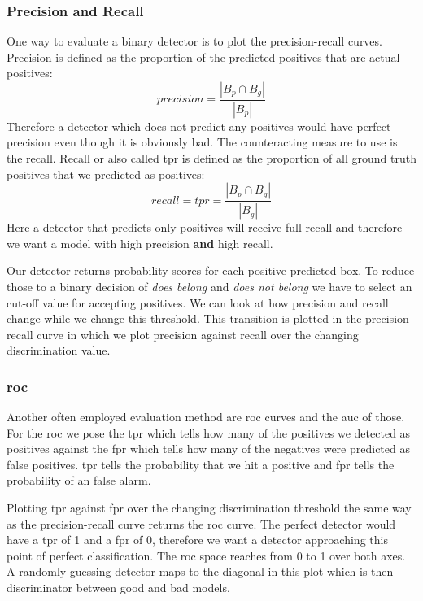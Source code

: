 \subsubsection{Precision and Recall}
One way to evaluate a binary detector is to plot the precision-recall curves. Precision is defined as the proportion of the predicted positives that are actual positives:
\begin{equation}
    \textit{precision} = \frac{|B_p \cap B_g|}{|B_p|}
\end{equation}
Therefore a detector which does not predict any positives would have perfect precision even though it is obviously bad. The counteracting measure to use is the recall. Recall or also called \gls{tpr} is defined as the proportion of all ground truth positives that we predicted as positives:
\begin{equation}
    \textit{recall} = \textit{tpr} = \frac{|B_p \cap B_g|}{|B_g|}
\end{equation}
Here a detector that predicts only positives will receive full recall and therefore we want a model with high precision \textbf{and} high recall.

Our detector returns probability scores for each positive predicted box. To reduce those to a binary decision of \textit{does belong} and \textit{does not belong} we have to select an cut-off value for accepting positives. We can look at how precision and recall change while we change this threshold. This transition is plotted in the precision-recall curve in which we plot precision against recall over the changing discrimination value.

\clearpage
\subsubsection{\gls{roc}}
Another often employed evaluation method are \gls{roc} curves and the \gls{auc} of those. For the \gls{roc} we pose the \gls{tpr} which tells how many of the positives we detected as positives against the \gls{fpr} which tells how many of the negatives were predicted as false positives. \gls{tpr} tells the probability that we hit a positive and \gls{fpr} tells the probability of an false alarm.

Plotting \gls{tpr} against \gls{fpr} over the changing discrimination threshold the same way as the precision-recall curve returns the \gls{roc} curve. The perfect detector would have a \gls{tpr} of 1 and a \gls{fpr} of 0, therefore we want a detector approaching this point of perfect classification. The \gls{roc} space reaches from 0 to 1 over both axes. A randomly guessing detector maps to the diagonal in this plot which is then discriminator between good and bad models.

